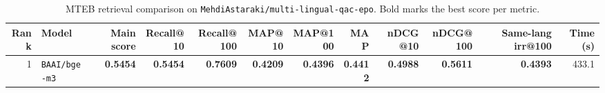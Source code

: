 \begin{table}[t]
\centering
\small
\begin{tabular}{r l r r r r r r r r r r}
\hline
Rank & Model & Main score & Recall@10 & Recall@100 & MAP@10 & MAP@100 & MAP & nDCG@10 & nDCG@100 & Same-lang irr@100 & Time (s) \\
\hline
1 & \texttt{BAAI/bge-m3} & \textbf{0.5454} & \textbf{0.5454} & \textbf{0.7609} & \textbf{0.4209} & \textbf{0.4396} & \textbf{0.4412} & \textbf{0.4988} & \textbf{0.5611} & \textbf{0.4393} & 433.1 \\
\hline
\end{tabular}
\caption{MTEB retrieval comparison on \texttt{MehdiAstaraki/multi-lingual-qac-epo}. Bold marks the best score per metric.}
\label{tab:mteb-model-comparison}
\end{table}
